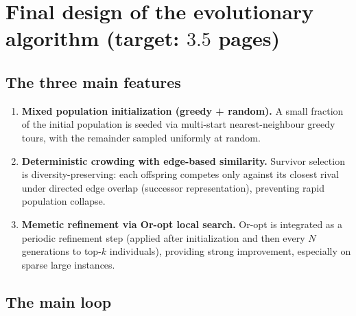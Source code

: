 \documentclass[a4paper,10pt]{article}
\newcommand{\ReplaceMe}[1]{{\color{blue}#1}}
\begin{document}
\section{Final design of the evolutionary algorithm \hfill(target: $3.5$ pages)} 

\subsection{The three main features}
\begin{enumerate}
  \item \textbf{Mixed population initialization (greedy + random).}
  A small fraction of the initial population is seeded via multi-start nearest-neighbour greedy tours, with the remainder sampled uniformly at random.

  \item \textbf{Deterministic crowding with edge-based similarity.}
  Survivor selection is diversity-preserving: each offspring competes only against its closest rival under directed edge overlap (successor representation), preventing rapid population collapse.

  \item \textbf{Memetic refinement via Or-opt local search.}
  Or-opt is integrated as a periodic refinement step (applied after initialization and then every $N$ generations to top-$k$ individuals), providing strong improvement, especially on sparse large instances.
\end{enumerate}

\subsection{The main loop}



\end{document}
